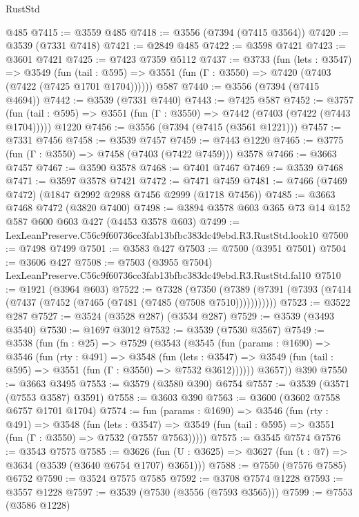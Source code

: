 \begin{lexlean}{RustStd}
\begin{coremodule}
    @485
@7415 := @3559 @485
@7418 := @3556 (@7394 (@7415 @3564))
@7420 := @3539 (@7331 @7418)
@7421 := @2849 @485
@7422 := @3598 @7421
@7423 := @3601 @7421
@7425 := @7423 @7359 @5112
@7437 := @3733
    (fun (lets : @3547) =>
    @3549
      (fun (tail : @595) => @3551 (fun (Γ : @3550) => @7420 (@7403 (@7422 (@7425 @1701 @1704))))))
    @587
@7440 := @3556 (@7394 (@7415 @4694))
@7442 := @3539 (@7331 @7440)
@7443 := @7425 @587
@7452 := @3757
    (fun (tail : @595) => @3551 (fun (Γ : @3550) => @7442 (@7403 (@7422 (@7443 @1704)))))
    @1220
@7456 := @3556 (@7394 (@7415 (@3561 @1221)))
@7457 := @7331 @7456
@7458 := @3539 @7457
@7459 := @7443 @1220
@7465 := @3775 (fun (Γ : @3550) => @7458 (@7403 (@7422 @7459))) @3578
@7466 := @3663 @7457
@7467 := @3590 @3578
@7468 := @7401 @7467
@7469 := @3539 @7468
@7471 := @3597 @3578 @7421
@7472 := @7471 @7459
@7481 := @7466 (@7469 @7472) (@1847 @2992 @2988 @7456 @2999 (@1718 @7456))
@7485 := @3663 @7468 @7472 (@3820 @7400)
@7498 := @3894 @3578 @603 @365 @73 @14 @152 @587 @600 @603 @427 (@4453 @3578 @603)
@7499 := LexLeanPreserve.C56c9f60736cc3fab13bfbc383dc49ebd.R3.RustStd.look10
@7500 := @7498 @7499
@7501 := @3583 @427
@7503 := @7500 (@3951 @7501)
@7504 := @3606 @427
@7508 := @7503 (@3955 @7504) LexLeanPreserve.C56c9f60736cc3fab13bfbc383dc49ebd.R3.RustStd.fal10
@7510 := @1921 (@3964 @603)
@7522 := @7328
    (@7350 (@7389 (@7391 (@7393 (@7414 (@7437 (@7452 (@7465 (@7481 (@7485 (@7508 @7510)))))))))))
@7523 := @3522 @287
@7527 := @3524 (@3528 @287) (@3534 @287)
@7529 := @3539 (@3493 @3540)
@7530 := @1697 @3012
@7532 := @3539 (@7530 @3567)
@7549 := @3538
    (fun (fn : @25) =>
    @7529
      (@3543
        (@3545
          (fun (params : @1690) =>
          @3546
            (fun (rty : @491) =>
            @3548
              (fun (lets : @3547) =>
              @3549 (fun (tail : @595) => @3551 (fun (Γ : @3550) => @7532 @3612))))))
        @3657))
    @390
@7550 := @3663 @3495
@7553 := @3579 (@3580 @390) @6754
@7557 := @3539 (@3571 (@7553 @3587) @3591)
@7558 := @3603 @390
@7563 := @3600 (@3602 @7558 @6757 @1701 @1704)
@7574 := fun (params : @1690) =>
  @3546
    (fun (rty : @491) =>
    @3548
      (fun (lets : @3547) =>
      @3549 (fun (tail : @595) => @3551 (fun (Γ : @3550) => @7532 (@7557 @7563)))))
@7575 := @3545 @7574
@7576 := @3543 @7575
@7585 := @3626 (fun (U : @3625) => @3627 (fun (t : @7) => @3634 (@3539 (@3640 @6754 @1707) @3651)))
@7588 := @7550 (@7576 @7585) @6752
@7590 := @3524 @7575 @7585
@7592 := @3708 @7574 @1228
@7593 := @3557 @1228
@7597 := @3539 (@7530 (@3556 (@7593 @3565)))
@7599 := @7553 (@3586 @1228)

\end{coremodule}
\end{lexlean}
